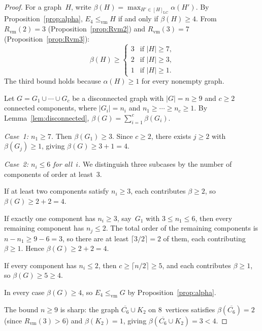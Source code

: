 \documentclass[11pt]{amsart}
\theoremstyle{definition}
\theoremstyle{remark}
\newcommand{\Rvm}{R_{\mathrm{vm}}}
\newcommand{\LC}{\mathrm{LC}}
\newcommand{\vm}{\leq_{\mathrm{vm}}}
\begin{document}
\begin{proof}
  For a graph~$H$, write
  $\beta(H)=\max_{H'\in[H]_{\LC}}\alpha(H')$.  By
  Proposition~\ref{prop:alpha}, $E_4\vm H$ if and only if
  $\beta(H)\geq 4$.  From $\Rvm(2)=3$
  (Proposition~\ref{prop:Rvm2}) and $\Rvm(3)=7$
  (Proposition~\ref{prop:Rvm3}):
  \[
    \beta(H)\geq
    \begin{cases}
      3 & \text{if $|H|\geq 7$,}\\
      2 & \text{if $|H|\geq 3$,}\\
      1 & \text{if $|H|\geq 1$.}
    \end{cases}
  \]
  The third bound holds because $\alpha(H)\geq 1$ for every nonempty
  graph.

  Let $G=G_1\cup\cdots\cup G_c$ be a disconnected graph with
  $|G|=n\geq 9$ and $c\geq 2$ connected components, where
  $|G_i|=n_i$ and $n_1\geq\cdots\geq n_c\geq 1$.  By
  Lemma~\ref{lem:disconnected},
  $\beta(G)=\sum_{i=1}^{c}\beta(G_i)$.

  \smallskip
  \emph{Case~1: $n_1\geq 7$.}
  Then $\beta(G_1)\geq 3$.  Since $c\geq 2$, there exists $j\geq 2$
  with $\beta(G_j)\geq 1$, giving $\beta(G)\geq 3+1=4$.

  \smallskip
  \emph{Case~2: $n_i\leq 6$ for all~$i$.}
  We distinguish three subcases by the number of components of order
  at least~$3$.

  If at least two components satisfy $n_i\geq 3$, each contributes
  $\beta\geq 2$, so $\beta(G)\geq 2+2=4$.

  If exactly one component has $n_i\geq 3$, say~$G_1$ with
  $3\leq n_1\leq 6$, then every remaining component has $n_j\leq 2$.
  The total order of the remaining components is
  $n-n_1\geq 9-6=3$, so there are at least
  $\lceil 3/2\rceil=2$ of them, each contributing $\beta\geq 1$.
  Hence $\beta(G)\geq 2+2=4$.

  If every component has $n_i\leq 2$, then
  $c\geq\lceil n/2\rceil\geq 5$, and each contributes $\beta\geq 1$,
  so $\beta(G)\geq 5\geq 4$.

  \smallskip
  In every case $\beta(G)\geq 4$, so $E_4\vm G$ by
  Proposition~\ref{prop:alpha}.

  \smallskip
  The bound $n\geq 9$ is sharp: the graph
  $\overline{C_6}\cup K_2$ on $8$~vertices satisfies
  $\beta(\overline{C_6})=2$ (since $\Rvm(3)>6$) and
  $\beta(K_2)=1$, giving
  $\beta(\overline{C_6}\cup K_2)=3<4$.
\end{proof}


\end{document}
